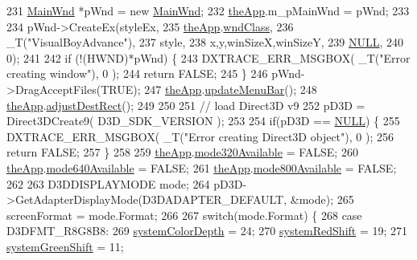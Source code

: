 \begin{DoxyCode}
231     \mbox{\hyperlink{class_main_wnd}{MainWnd}} *pWnd = \textcolor{keyword}{new} \mbox{\hyperlink{class_main_wnd}{MainWnd}};
232     \mbox{\hyperlink{_v_b_a_8cpp_a8095a9d06b37a7efe3723f3218ad8fb3}{theApp}}.m\_pMainWnd = pWnd;
233 
234     pWnd->CreateEx(styleEx,
235         \mbox{\hyperlink{_v_b_a_8cpp_a8095a9d06b37a7efe3723f3218ad8fb3}{theApp}}.\mbox{\hyperlink{class_v_b_a_acd3b584c09c85ec31168b1f7d1d8505e}{wndClass}},
236         \_T(\textcolor{stringliteral}{"VisualBoyAdvance"}),
237         style,
238         x,y,winSizeX,winSizeY,
239         \mbox{\hyperlink{getopt1_8c_a070d2ce7b6bb7e5c05602aa8c308d0c4}{NULL}},
240         0);
241 
242     \textcolor{keywordflow}{if} (!(HWND)*pWnd) \{
243         DXTRACE\_ERR\_MSGBOX( \_T(\textcolor{stringliteral}{"Error creating window"}), 0 );
244         \textcolor{keywordflow}{return} FALSE;
245     \}
246     pWnd->DragAcceptFiles(TRUE);
247     \mbox{\hyperlink{_v_b_a_8cpp_a8095a9d06b37a7efe3723f3218ad8fb3}{theApp}}.\mbox{\hyperlink{class_v_b_a_accf3451bad473b90400193636cd27c96}{updateMenuBar}}();
248     \mbox{\hyperlink{_v_b_a_8cpp_a8095a9d06b37a7efe3723f3218ad8fb3}{theApp}}.\mbox{\hyperlink{class_v_b_a_acb822065cba8b15810c5a61fd05ca831}{adjustDestRect}}();
249 
250 
251     \textcolor{comment}{// load Direct3D v9}
252     pD3D = Direct3DCreate9( D3D\_SDK\_VERSION );
253 
254     \textcolor{keywordflow}{if}(pD3D == \mbox{\hyperlink{getopt1_8c_a070d2ce7b6bb7e5c05602aa8c308d0c4}{NULL}}) \{
255         DXTRACE\_ERR\_MSGBOX( \_T(\textcolor{stringliteral}{"Error creating Direct3D object"}), 0 );
256         \textcolor{keywordflow}{return} FALSE;
257     \}
258 
259     \mbox{\hyperlink{_v_b_a_8cpp_a8095a9d06b37a7efe3723f3218ad8fb3}{theApp}}.\mbox{\hyperlink{class_v_b_a_adcefc742bdb15ddb902bcb2df896d298}{mode320Available}} = FALSE;
260     \mbox{\hyperlink{_v_b_a_8cpp_a8095a9d06b37a7efe3723f3218ad8fb3}{theApp}}.\mbox{\hyperlink{class_v_b_a_adc44d61208b927bde7ea49c25a2e30bc}{mode640Available}} = FALSE;
261     \mbox{\hyperlink{_v_b_a_8cpp_a8095a9d06b37a7efe3723f3218ad8fb3}{theApp}}.\mbox{\hyperlink{class_v_b_a_a3e2e940c6531daba73473c51a9916574}{mode800Available}} = FALSE;
262 
263     D3DDISPLAYMODE mode;
264     pD3D->GetAdapterDisplayMode(D3DADAPTER\_DEFAULT, &mode);
265     screenFormat = mode.Format;
266 
267     \textcolor{keywordflow}{switch}(mode.Format) \{
268   \textcolor{keywordflow}{case} D3DFMT\_R8G8B8:
269       \mbox{\hyperlink{system_8cpp_adaf454a4617a00b5cfed14c203ab6efa}{systemColorDepth}} = 24;
270       \mbox{\hyperlink{system_8cpp_a85b93b8fc1532633063574112af2de18}{systemRedShift}} = 19;
271       \mbox{\hyperlink{system_8cpp_a6ae69465c0e8ab78f44b7f31b4967f9a}{systemGreenShift}} = 11;

\end{DoxyCode}

